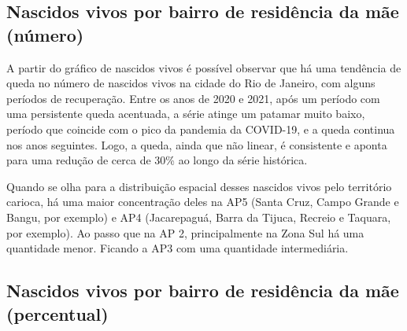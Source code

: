 
\subsection{Nascidos vivos por bairro de residência da mãe (número)}


A partir do gráfico de nascidos vivos é possível observar que há uma tendência de queda no número de nascidos vivos na cidade do Rio de Janeiro, com alguns períodos de recuperação. Entre os anos de 2020 e 2021, após um período com uma persistente queda acentuada, a série atinge um patamar muito baixo, período que coincide com o pico da pandemia da COVID-19, e a queda continua nos anos seguintes. Logo, a queda, ainda que não linear, é consistente e aponta para uma redução de cerca de 30\% ao longo da série histórica.


Quando se olha para a distribuição espacial desses nascidos vivos pelo território carioca, há uma maior concentração deles na AP5 (Santa Cruz, Campo Grande e Bangu, por exemplo) e AP4 (Jacarepaguá, Barra da Tijuca, Recreio e Taquara, por exemplo). Ao passo que na AP 2, principalmente na Zona Sul há uma quantidade menor. Ficando a AP3 com uma quantidade intermediária.


\subsection{Nascidos vivos por bairro de residência da mãe (percentual)}


